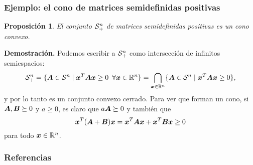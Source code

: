 \documentclass[aspectratio=169,12pt,spanish]{beamer}
\newtheorem{proposition}[theorem]{Proposición}
\begin{document}
\begin{frame}
\frametitle{Ejemplo: el cono de matrices semidefinidas positivas}

\begin{proposition}
El conjunto ${\mathcal S_+^n}$ de matrices semidefinidas positivas es un cono convexo.
\end{proposition}

\textbf{Demostración.}
Podemos escribir a ${\mathcal S_+^n}$ como intersección de infinitos semiespacios:
$$
{\mathcal S_+^n} = \{\bm{A} \in {\mathcal S^n} \mid \bm{x}^T \bm{A} \bm{x} \ge 0 \enspace \forall \bm{x} \in \mathbb{R}^n\} = \bigcap_{\bm{x}\in\mathbb{R}^n} \{\bm{A} \in {\mathcal S^n} \mid \bm{x}^T \bm{A} \bm{x} \ge 0\},
$$
y por lo tanto es un conjunto convexo cerrado.
Para ver que forman un cono, si $\bm{A}, \bm{B} \succeq 0$ y $a \ge 0$, es claro que $a \bm{A} \succeq 0$ y también que
$$\bm{x}^T (\bm{A} + \bm{B}) \bm{x} = \bm{x}^T \bm{A} \bm{x} + \bm{x}^T \bm{B} \bm{x} \ge 0$$
 para todo $\bm{x} \in \mathbb{R}^n$.

\end{frame}



\begin{frame}
\frametitle{Referencias}




\end{frame}
\end{document}
